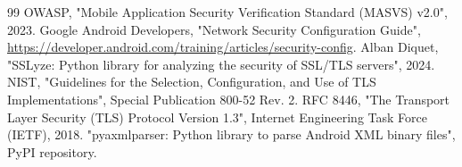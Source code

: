 \documentclass[11pt,a4paper]{article}
\begin{document}
\begin{thebibliography}{99}
 OWASP, "Mobile Application Security Verification Standard (MASVS) v2.0", 2023.
 Google Android Developers, "Network Security Configuration Guide", \url{https://developer.android.com/training/articles/security-config}.
 Alban Diquet, "SSLyze: Python library for analyzing the security of SSL/TLS servers", 2024.
 NIST, "Guidelines for the Selection, Configuration, and Use of TLS Implementations", Special Publication 800-52 Rev. 2.
 RFC 8446, "The Transport Layer Security (TLS) Protocol Version 1.3", Internet Engineering Task Force (IETF), 2018.
 "pyaxmlparser: Python library to parse Android XML binary files", PyPI repository.
\end{thebibliography}
\end{document}
